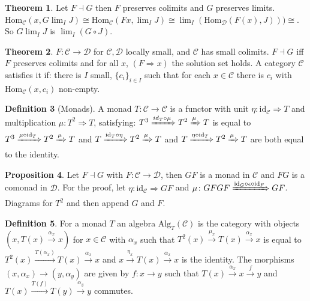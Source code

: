 \documentclass[a4paper,10pt]{article}
\theoremstyle{definition}
\newtheorem{theorem}{Theorem}
\newtheorem{definition}[theorem]{Definition}
\newtheorem{proposition}[theorem]{Proposition}
\newcommand{\Hom}[3][C]{\mathrm{Hom}_\mathcal{#1}(#2, #3)}
\newcommand{\C}{\mathcal{C}}
\newcommand{\D}{\mathcal{D}}
\newcommand{\id}{\mathrm{id}}
\begin{document}
\begin{theorem}
    Let $F \dashv G$ then $F$ preserves colimits and $G$ preserves limits. \\$\Hom{x}{G \lim_I J} \cong \Hom{Fx}{\lim_I J} \cong \lim_I(\Hom[D]{F(x)}{J})) \cong $. So $G \lim_I J$ is $\lim_I (G \circ J)$.
\end{theorem}

\begin{theorem}
    $F \colon \C \rightarrow \D$ for $\C, \D$ locally small, and $\C$ has small colimits.
    $F \dashv G$ iff $F$ preserves colimits and for all $x$, $(F \Rightarrow x)$ the solution set holds. A category $\C$ satisfies it if:
    there is $I$ small, $\{c_i\}_{i \in I}$ such that for each $x \in \C$ there is $c_i$ with $\Hom{x}{c_i}$ non-empty.
\end{theorem}


\begin{definition}[Monads]
    A monad $T \colon \C \rightarrow \C$ is a functor with unit $\eta \colon \id_\C \Rightarrow T$ and multiplication $\mu \colon T^2 \Rightarrow T$, satisfying: $T^3 \xRightarrow{id_T \circ \mu} T^2 \xRightarrow{\mu} T$ is equal to $T^3 \xRightarrow{\mu \circ \id_T} T^2 \xRightarrow{\mu} T$ and $T \xRightarrow{\id_T \circ \eta} T^2 \xRightarrow{\mu} T$ and $T \xRightarrow{\eta \circ \id_T} T^2 \xRightarrow{\mu} T$ are both equal to the identity.
\end{definition}

\begin{proposition}
    Let $F \dashv G$ with $F \colon \C \rightarrow \D$, then $GF$ is a monad in $\C$ and $FG$ is a comonad in $\D$.
    For the proof, let $\eta \colon \id_\C \Rightarrow GF$  and $\mu \colon GFGF \xRightarrow{\id_G \circ \epsilon \circ \id_F} GF$. Diagrams for $T^2$ and then append $G$ and $F$.
\end{proposition}

\begin{definition}
    For a monad $T$ an algebra $\mathrm{Alg}_T(\C)$ is the category with objects $(x, T(x) \xrightarrow {\alpha_x} x)$ for $x \in \C$ with $\alpha_x$ such that $T^2(x) \xrightarrow{\mu_x} T(x) \xrightarrow{\alpha_x} x$ is equal to $T^2(x) \xrightarrow{T(\alpha_x)} T(x) \xrightarrow{\alpha_x} x$ and $x \xrightarrow{\eta_x} T(x) \xrightarrow{\alpha_x} x$ is the identity. The morphisms $(x, \alpha_x) \rightarrow (y, \alpha_y)$ are given by $f \colon x \rightarrow y$ such that $T(x) \xrightarrow{\alpha_x} x \xrightarrow{f} y$ and $T(x) \xrightarrow{T(f)} T(y) \xrightarrow{\alpha_y} y$ commutes.
\end{definition}
\end{document}
